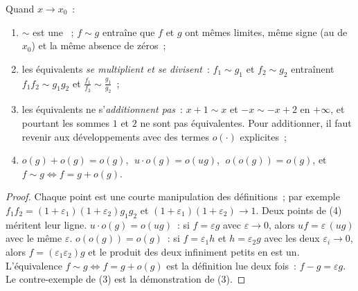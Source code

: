 \begin{proposition}[Règles]\label{prop:b1:taylor:landaurules}
Quand $x \to x_0$~:
\begin{enumerate}
  \item $\sim$ est une ~; $f \sim g$ entraîne que
        $f$ et $g$ ont mêmes limites, même signe (au  de
        $x_0$) et la même absence de zéros~;
  \item les équivalents \emph{se multiplient et se divisent}~: $f_1
        \sim g_1$ et $f_2 \sim g_2$ entraînent $f_1 f_2 \sim g_1 g_2$
        et $\frac{f_1}{f_2} \sim \frac{g_1}{g_2}$~;
  \item les équivalents ne s'\emph{additionnent pas}~: $x + 1 \sim x$
        et $-x \sim -x + 2$ en $+\infty$, et pourtant les sommes $1$ et
        $2$ ne sont pas équivalentes. Pour additionner, il faut revenir
        aux développements avec des termes $o(\cdot)$ explicites~;
  \item $o(g) + o(g) = o(g)$, $\;u \cdot o(g) = o(ug)$, $\;o(o(g)) =
        o(g)$, et $f \sim g \iff f = g + o(g)$.
\end{enumerate}
\end{proposition}

\begin{proof}
Chaque point est une courte manipulation des définitions~; par exemple
$f_1 f_2 = (1+\varepsilon_1)(1+\varepsilon_2) g_1 g_2$ et $(1 +
\varepsilon_1)(1+\varepsilon_2) \to 1$. Deux points de (4) méritent
leur ligne. $u\cdot o(g) = o(ug)$~: si $f = \varepsilon g$ avec
$\varepsilon \to 0$, alors $uf = \varepsilon\,(ug)$ avec le même
$\varepsilon$. $o(o(g)) = o(g)$~: si $f = \varepsilon_1 h$ et
$h = \varepsilon_2 g$ avec les deux $\varepsilon_i \to 0$, alors $f =
(\varepsilon_1\varepsilon_2) g$ et le produit des deux infiniment
petits en est un. L'équivalence $f \sim g \iff f = g +
o(g)$ est la définition lue deux fois~: $f - g = \varepsilon g$.
Le contre-exemple de (3) est la démonstration de (3).
\end{proof}

